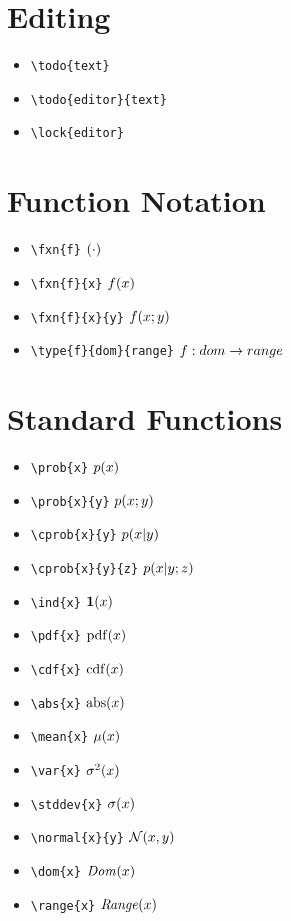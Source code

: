 \documentclass{article}
\begin{document}
\section{Editing}
\begin{itemize}
  \item \verb!\todo{text}! 
  \item \verb!\todo{editor}{text}! 
  \item \verb!\lock{editor}! 
\end{itemize}

\section{Function Notation}
\begin{itemize}
  \item \verb!\fxn{f}! $\fxn{}$
  \item \verb!\fxn{f}{x}! $\fxn{f}{x}$
  \item \verb!\fxn{f}{x}{y}! $\fxn{f}{x}{y}$
  \item \verb!\type{f}{dom}{range}! $f : dom \rightarrow range$
\end{itemize}

\section{Standard Functions}
\begin{itemize}
  \item \verb!\prob{x}! $\prob{x}$
  \item \verb!\prob{x}{y}! $\prob{x}{y}$
  \item \verb!\cprob{x}{y}! $\cprob{x}{y}$
  \item \verb!\cprob{x}{y}{z}! $\cprob{x}{y}{z}$
  \item \verb!\ind{x}! $\ind{x}$
  \item \verb!\pdf{x}! $\pdf{x}$
  \item \verb!\cdf{x}! $\cdf{x}$
  \item \verb!\abs{x}! $\abs{x}$
  \item \verb!\mean{x}! $\mean{x}$
  \item \verb!\var{x}! $\var{x}$
  \item \verb!\stddev{x}! $\stddev{x}$
  \item \verb!\normal{x}{y}! $\normal{x}{y}$
  \item \verb!\dom{x}! $\dom{x}$
  \item \verb!\range{x}! $\range{x}$
\end{itemize}
\end{document}
